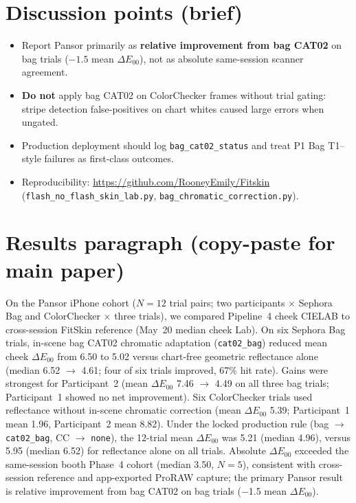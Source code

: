 \documentclass[11pt]{article}
\newcommand{\deee}{\ensuremath{\Delta E_{00}}}
\begin{document}
\section{Discussion points (brief)}

\begin{itemize}
  \item Report Pansor primarily as \textbf{relative improvement from bag CAT02} on bag trials ($-1.5$ mean $\deee$), not as absolute same-session scanner agreement.
  \item \textbf{Do not} apply bag CAT02 on ColorChecker frames without trial gating: stripe detection false-positives on chart whites caused large errors when ungated.
  \item Production deployment should log \texttt{bag\_cat02\_status} and treat P1 Bag T1--style failures as first-class outcomes.
  \item Reproducibility: \url{https://github.com/RooneyEmily/Fitskin} (\texttt{flash\_no\_flash\_skin\_lab.py}, \texttt{bag\_chromatic\_correction.py}).
\end{itemize}

\section*{Results paragraph (copy-paste for main paper)}
\small
On the Pansor iPhone cohort ($N=12$ trial pairs; two participants $\times$ Sephora Bag and ColorChecker $\times$ three trials), we compared Pipeline~4 cheek CIELAB to cross-session FitSkin reference (May~20 median cheek Lab). On six Sephora Bag trials, in-scene bag CAT02 chromatic adaptation (\texttt{cat02\_bag}) reduced mean cheek $\deee$ from 6.50 to 5.02 versus chart-free geometric reflectance alone (median 6.52 $\rightarrow$ 4.61; four of six trials improved, 67\% hit rate). Gains were strongest for Participant~2 (mean $\deee$ 7.46 $\rightarrow$ 4.49 on all three bag trials; Participant~1 showed no net improvement). Six ColorChecker trials used reflectance without in-scene chromatic correction (mean $\deee$ 5.39; Participant~1 mean 1.96, Participant~2 mean 8.82). Under the locked production rule (bag $\rightarrow$ \texttt{cat02\_bag}, CC $\rightarrow$ \texttt{none}), the 12-trial mean $\deee$ was 5.21 (median 4.96), versus 5.95 (median 6.52) for reflectance alone on all trials. Absolute $\deee$ exceeded the same-session booth Phase~4 cohort (median 3.50, $N=5$), consistent with cross-session reference and app-exported ProRAW capture; the primary Pansor result is relative improvement from bag CAT02 on bag trials ($-$1.5 mean $\deee$).
\end{document}
